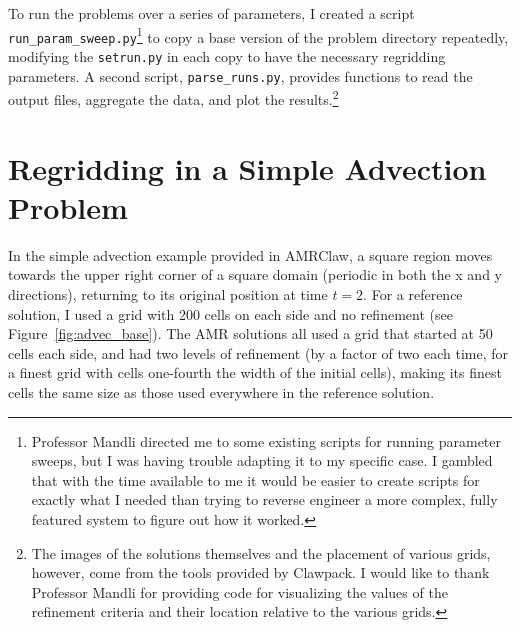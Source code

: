 \documentclass[11pt]{article}
\begin{document}
To run the problems over a series of parameters, I created a script
\texttt{run\_param\_sweep.py}\footnote{Professor Mandli directed me to some
existing scripts for running parameter sweeps, but I was having trouble
adapting it to my specific case. I gambled that with the time available to me
it would be easier to create scripts for exactly what I needed than trying to
reverse engineer a more complex, fully featured system to figure out how it
worked.} to copy a base version of the problem directory repeatedly,
modifying the \texttt{setrun.py} in each copy to have the necessary 
regridding parameters. A second script, \texttt{parse\_runs.py}, provides
functions to read the output files, aggregate the data, and plot the
results.\footnote{The images of the solutions themselves and the placement of 
various grids, however, come from the tools provided by Clawpack. 
I would like to thank Professor Mandli for providing code for visualizing
the values of the refinement criteria and their location relative to the
various grids.}

\section*{Regridding in a Simple Advection Problem}
In the simple advection example provided in AMRClaw, a square region moves
towards the upper right corner of a square domain (periodic in both the 
x and y directions), returning to its original position at time $t=2$. For a reference
solution, I used a grid with 200 cells on each side and no refinement
(see Figure~\ref{fig:advec_base}). The
AMR solutions all used a grid that started at 50 cells each side, and had
two levels of refinement (by a factor of two each time, for a finest grid
with cells one-fourth the width of the initial cells), making its finest 
cells the same size as those used everywhere in the reference solution.
\end{document}

